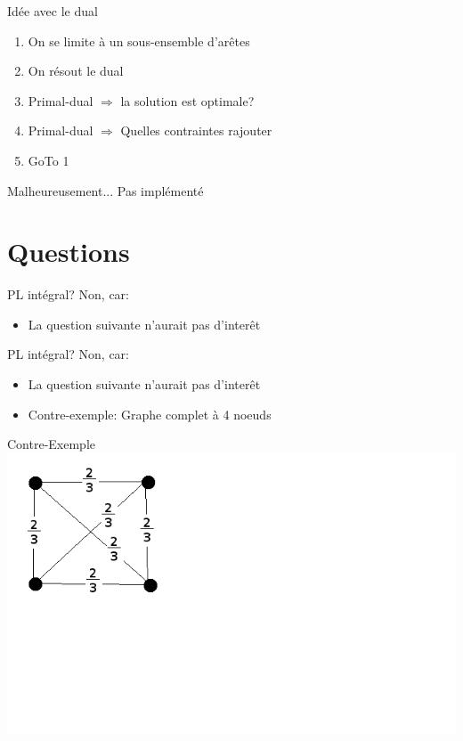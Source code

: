 \documentclass{beamer}
\begin{document}
\begin{frame}{Idée avec le dual}
\begin{enumerate}
\item On se limite à un sous-ensemble d'arêtes
\item On résout le dual
\item Primal-dual $\Rightarrow$ la solution est optimale?
\item Primal-dual $\Rightarrow$ Quelles contraintes rajouter
\item GoTo 1
\end{enumerate}

\begin{alertblock}{Malheureusement...}
Pas implémenté
\end{alertblock}
\end{frame}

\section{Questions}
\begin{frame}{PL intégral?}
Non, car:

\begin{itemize}
\item La question suivante n'aurait pas d'interêt
\end{itemize}
\end{frame}

\begin{frame}{PL intégral?}
Non, car:

\begin{itemize}
\item La question suivante n'aurait pas d'interêt
\item Contre-exemple: Graphe complet à 4 noeuds
\end{itemize}
\end{frame}

\begin{frame}{Contre-Exemple}
\includegraphics{counter_example.png}
\end{frame}
\end{document}
